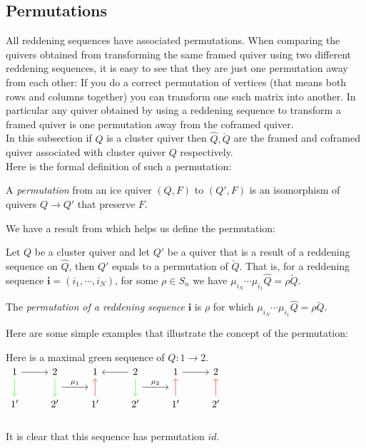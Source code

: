 \subsection{Permutations}
\indent All reddening sequences have associated permutations. When comparing the quivers obtained from transforming the same framed quiver using two different reddening sequences, it is easy to see that they are just one permutation away from each other: If you do a correct permutation of vertices (that means both rows and columns together) you can transform one such matrix into another. In particular any quiver obtained by using a reddening sequence to transform a framed quiver is one permutation away from the coframed quiver.\\
\indent In this subsection if $Q$ is a cluster quiver then $\hat{Q}, \breve{Q}$ are the framed and coframed quiver associated with cluster quiver $Q$ respectively.\\
\indent Here is the formal definition of such a permutation:\\
\begin{definition}
\cite{BDP13} A \textit{permutation} from an ice quiver $(Q,F)$ to $(Q',F)$ is an isomorphism of quivers $Q\rightarrow Q'$ that preserve $F$.\\
\end{definition}
\indent We have a result from \cite{BDP13} which helps us define the permutation:\\
\begin{theorem}
\cite{BDP13} Let $Q$ be a cluster quiver and let $Q'$ be a quiver that is a result of a reddening sequence on $\hat{Q}$, then  $Q'$ equals to a permutation of $\breve{Q}$. That is, for a reddening sequence $\mathbf{i}=(i_1,\cdots, i_N)$, for some $\rho\in S_n$ we have $\mu_{i_N}\cdots\mu_{i_1}\hat{Q}=\rho\breve{Q}$.\\
\end{theorem}
\begin{definition}
\cite{GM14} The \textit{permutation of a reddening sequence} $\mathbf{i}$ is $\rho$ for which $\mu_{i_N}\cdots\mu_{i_1}\hat{Q}=\rho\breve{Q}$.\\
\end{definition}
\indent Here are some simple examples that illustrate the concept of the permutation:\\
\begin{example}
Here is a maximal green sequence of $Q:1\to 2$.\\
$\begin{tikzcd}
1 \arrow[r] \arrow[d,green] & 2\arrow [d,green]\arrow[r,"\mu_1", shift right=3.5ex]  & 1&2\arrow[l]\arrow[d,green]\arrow[r,"\mu_2", shift right=3.5ex]&1\arrow[r] & 2\\
1' & 2'&1'\arrow[u,red]& 2'&1'\arrow[u,red] & 2'\arrow[u,red]\\
\end{tikzcd}$\\
\indent It is clear that this sequence has permutation $id$.
\end{example} 
